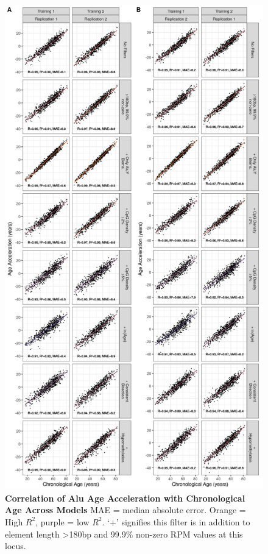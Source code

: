 \documentclass[
]{book}
\begin{document}
\begin{figure}

{\centering \includegraphics[width=0.9\linewidth]{./figs/accel_corplots_panel_split} 

}

\caption{\textbf{Correlation of Alu Age Acceleration with Chronological Age Across Models} MAE = median absolute error. Orange = High \(R^2\), purple = low \(R^2\). `+' signifies this filter is in addition to element length \textgreater180bp and 99.9\% non-zero RPM values at this locus.}\label{fig:accelCorplotsPanelSplit}
\end{figure}
\end{document}
